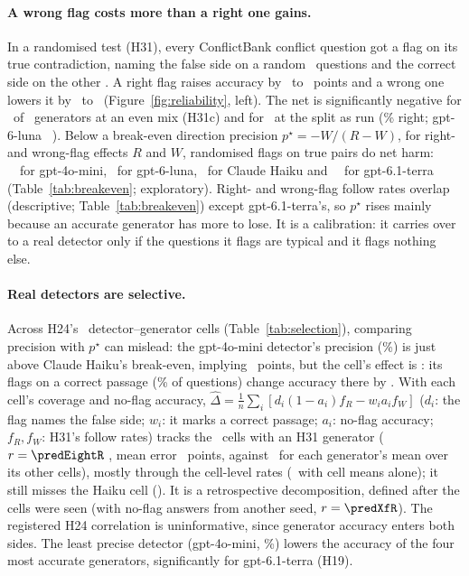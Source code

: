 \paragraph{A wrong flag costs more than a right one gains.} In a randomised test (H31), every ConflictBank conflict
question got a flag on its true contradiction, naming the false side on a random \nRandRight\ questions and the
correct side on the other \nRandWrong. A right flag raises accuracy by \hThirtyOneAMin\ to \hThirtyOneAMax\ points and
a wrong one lowers it by \ahThirtyOneBMax\ to \ahThirtyOneBMin\ (Figure~\ref{fig:reliability}, left). The net is
significantly negative for \nHThirtyOneCSig\ of \nHThirtyOneCTests\ generators at an even mix (H31c) and for
\nRealThirtyOneSig\ at the split as run (\shareRight\% right; gpt-6-luna \realThirtyOneLuna\ \realThirtyOneLunaCI).
Below a break-even direction precision $p^\star=-W/(R-W)$, for right- and wrong-flag effects $R$ and $W$, randomised
flags on true pairs do net harm: \beMini\ \beMiniCI\ for gpt-4o-mini, \beLuna\ for gpt-6-luna, \beHaiku\ for Claude
Haiku and \beTerra\ \beTerraCI\ for gpt-6.1-terra (Table~\ref{tab:breakeven}; exploratory). Right- and wrong-flag
follow rates overlap (descriptive; Table~\ref{tab:breakeven}) except gpt-6.1-terra's, so $p^\star$ rises mainly
because an accurate generator has more to lose. It is a calibration: it carries over to a real detector only if the
questions it flags are typical and it flags nothing else.

\paragraph{Real detectors are selective.} Across H24's \hTwentyFourCells\ detector--generator cells
(Table~\ref{tab:selection}), comparing precision with $p^\star$ can mislead: the gpt-4o-mini detector's precision
(\selHaikuMiniPrec\%) is just above Claude Haiku's break-even, implying \selHaikuMiniMarg\ points, but the cell's effect is
\selHaikuMiniObs: its flags on a correct passage (\selHaikuMiniWrongShare\% of questions) change accuracy there by
\selHaikuMiniWrongGain. With each cell's coverage and no-flag accuracy,
$\hat\Delta=\frac1n\sum_i[d_i(1-a_i)f_R-w_ia_if_W]$ ($d_i$: the flag names the false side; $w_i$: it marks a correct
passage; $a_i$: no-flag accuracy; $f_R,f_W$: H31's follow rates) tracks the \predEightN\ cells with an H31 generator
($r=\predEightR$ \predEightRCI, mean error \predEightMae\ points, against \predGenMae\ for each generator's mean over
its other cells), mostly through the cell-level rates (\predMargMae\ with cell means alone); it still misses the
Haiku cell (\predHaikuMini). It is a retrospective decomposition, defined after the cells were seen (with no-flag
answers from another seed, $r=\predXfR$). The registered H24 correlation is uninformative, since generator accuracy
enters both sides. The least precise detector (gpt-4o-mini, \dirPrecMini\%) lowers the accuracy of the four most
accurate generators, significantly for gpt-6.1-terra (H19).


